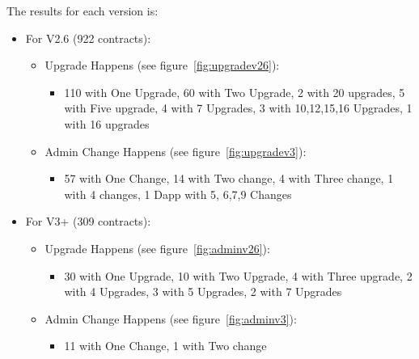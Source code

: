 The results for each version is:
\begin{itemize}
  \item For V2.6 (922 contracts):
  \begin{itemize}
    \item Upgrade Happens (see figure~\ref{fig:upgradev26}):
    \begin{itemize}
      \item 110 with One Upgrade, 60 with Two Upgrade, 2 with 20 upgrades, 5 with Five upgrade, 4 with 7 Upgrades, 3 with 10,12,15,16 Upgrades, 1 with 16 upgrades
    \end{itemize}
    \item Admin Change Happens (see figure~\ref{fig:upgradev3}):
    \begin{itemize}
      \item 57 with One Change, 14 with Two change, 4 with Three change, 1 with 4 changes, 1 Dapp with 5, 6,7,9 Changes
    \end{itemize}
  \end{itemize}
  \item For V3+ (309 contracts):
  \begin{itemize}
    \item Upgrade Happens (see figure~\ref{fig:adminv26}):
    \begin{itemize}
      \item 30 with One Upgrade, 10 with Two Upgrade, 4 with Three upgrade, 2 with 4 Upgrades, 3 with 5 Upgrades, 2 with 7 Upgrades
    \end{itemize}
    \item Admin Change Happens (see figure~\ref{fig:adminv3}):
    \begin{itemize}
      \item 11 with One Change, 1 with Two change
    \end{itemize}
  \end{itemize}
\end{itemize}


